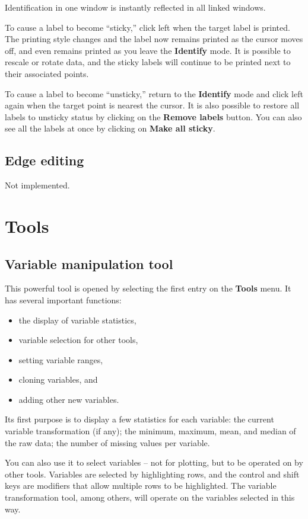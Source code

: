 \documentclass[11pt]{article}
\begin{document}
Identification in one window is instantly reflected in all linked windows.

To cause a label to become ``sticky,'' click left when the target
label is printed.  The printing style changes and the label now
remains printed as the cursor moves off, and even remains printed as
you leave the {\bf Identify} mode.  It is possible to rescale or
rotate data, and the sticky labels will continue to be printed next
to their associated points.

To cause a label to become ``unsticky,'' return to the {\bf Identify}
mode and click left again when the target point is nearest the
cursor.  It is also possible to restore all labels to unsticky status
by clicking on the {\bf Remove labels} button.  You can also see all
the labels at once by clicking on {\bf Make all sticky}.

\subsection{Edge editing}

Not implemented.


\newpage
\section{Tools}
\label{Tools}

\subsection{Variable manipulation tool}
\label{slbl:VarManip}

This powerful tool is opened by selecting the first entry on the
{\bf Tools} menu.  It has several important functions:
\begin{itemize}
\itemsep 0em
\item the display of variable statistics,
\item variable selection for other tools,
\item setting variable ranges,
\item cloning variables, and
\item adding other new variables.
\end{itemize}

Its first purpose is to display a few statistics for each variable:
the current variable transformation (if any); the minimum, maximum,
mean, and median of the raw data; the number of missing values per variable.

You can also use it to select variables -- not for plotting, but to
be operated on by other tools.  Variables are selected by highlighting
rows, and the control and shift keys are modifiers that allow multiple
rows to be highlighted.  The variable transformation tool, among
others, will operate on the variables selected in this way.
\end{document}
